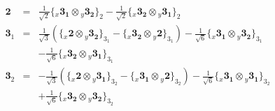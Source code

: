 \documentclass[english]{article}
\newcommand{\rep}[1]{\mathbf{#1}}
\newcommand{\repx}[2]{{}_{#2}\mathbf{#1}}
\newcommand{\subcg}[3]{\big\{ \repx{#1}{x}\otimes\repx{#2}{y}\big\}^{}_{#3}}
\begin{document}
\begin{itemize}
\begin{eqnarray*}
\rep{2} &=& \frac{1}{\sqrt{2}}\subcg{3_{1}}{3_{2}}{2}-\frac{1}{\sqrt{2}}\subcg{3_{2}}{3_{1}}{2}
\\
\rep{3}_{1} &=& \frac{1}{\sqrt{3}}\left(\subcg{2}{3_{2}}{3_{1}}-\subcg{3_{2}}{2}{3_{1}}\right)-\frac{1}{\sqrt{6}}\subcg{3_{1}}{3_{2}}{3_{1}} \\ 
 & & -\frac{1}{\sqrt{6}}\subcg{3_{2}}{3_{1}}{3_{1}}
\\
\rep{3}_{2} &=& -\frac{1}{\sqrt{3}}\left(\subcg{2}{3_{1}}{3_{2}}-\subcg{3_{1}}{2}{3_{2}}\right)-\frac{1}{\sqrt{6}}\subcg{3_{1}}{3_{1}}{3_{2}} \\ 
 & & +\frac{1}{\sqrt{6}}\subcg{3_{2}}{3_{2}}{3_{2}}
\end{eqnarray*}
\end{itemize}
\end{document}
